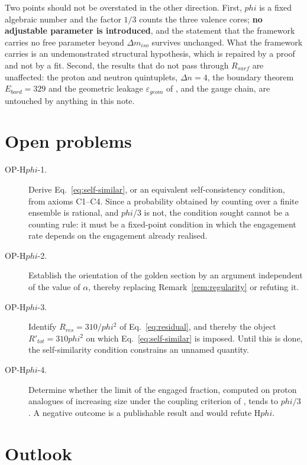 \documentclass[11pt,a4paper]{article}
\def\varphi{phi}%
\def\mathrm#1{#1}%
\theoremstyle{definition}
\theoremstyle{plain}
\theoremstyle{remark}
\newcommand{\Rsurf}{R_{\mathrm{surf}}}
\newcommand{\Rres}{R_{\mathrm{res}}}
\begin{document}
Two points should not be overstated in the other direction. First, $\varphi$ is a fixed algebraic number and the factor $1/3$ counts the three valence cores; \textbf{no adjustable parameter is introduced}, and the statement that the framework carries no free parameter beyond $\Delta m_{\mathrm{iso}}$ survives unchanged. What the framework carries is an undemonstrated structural hypothesis, which is repaired by a proof and not by a fit. Second, the results that do not pass through $\Rsurf$ are unaffected: the proton and neutron quintuplets, $\Delta n = 4$, the boundary theorem $E_{\mathrm{bord}} = 329$ and the geometric leakage $\varepsilon_{\mathrm{geom}}$ of \citet{PDL_D43}, and the gauge chain, are untouched by anything in this note.

\section{Open problems}
\label{sec:open}

\begin{description}
\item[OP-H$\varphi$-1.] Derive Eq.~\eqref{eq:self-similar}, or an equivalent self-consistency condition, from axioms C1--C4. Since a probability obtained by counting over a finite ensemble is rational, and $\varphi/3$ is not, the condition sought cannot be a counting rule: it must be a fixed-point condition in which the engagement rate depends on the engagement already realised.
\item[OP-H$\varphi$-2.] Establish the orientation of the golden section by an argument independent of the value of $\alpha$, thereby replacing Remark~\ref{rem:regularity} or refuting it.
\item[OP-H$\varphi$-3.] Identify $\Rres = 310/\varphi^{2}$ of Eq.~\eqref{eq:residual}, and thereby the object $R'_{\mathrm{tot}} = 310\varphi^2$ on which Eq.~\eqref{eq:self-similar} is imposed. Until this is done, the self-similarity condition constrains an unnamed quantity.
\item[OP-H$\varphi$-4.] Determine whether the limit of the engaged fraction, computed on proton analogues of increasing size under the coupling criterion of \citet{PDL_D14}, tends to $\varphi/3$. A negative outcome is a publishable result and would refute H$\varphi$.
\end{description}

\section{Outlook}
\end{document}
